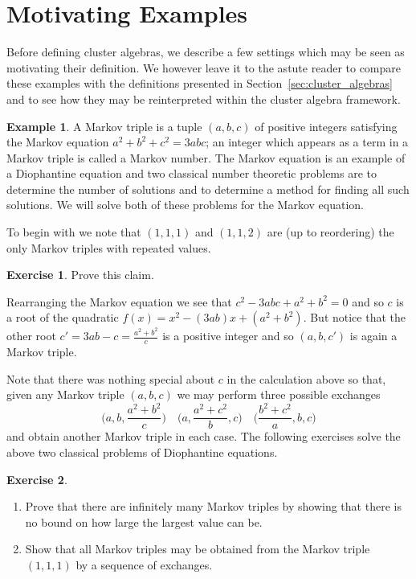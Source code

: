 \documentclass{amsart}
\theoremstyle{definition}
\newtheorem{example}[theorem]{Example}
\newtheorem{subexercise}{Exercise}[theorem]
\theoremstyle{remark}
\numberwithin{equation}{section}
\begin{document}
\section{Motivating Examples}\label{sec:motivation}
  Before defining cluster algebras, we describe a few settings which may be seen as motivating their definition.  We however leave it to the astute reader to compare these examples with the definitions presented in Section~\ref{sec:cluster_algebras} and to see how they may be reinterpreted within the cluster algebra framework.

  \begin{example}
    A Markov triple is a tuple $(a,b,c)$ of positive integers satisfying the Markov equation $a^2+b^2+c^2=3abc$; an integer which appears as a term in a Markov triple is called a Markov number.  The Markov equation is an example of a Diophantine equation and two classical number theoretic problems are to determine the number of solutions and to determine a method for finding all such solutions.  We will solve both of these problems for the Markov equation.

    To begin with we note that $(1,1,1)$ and $(1,1,2)$ are (up to reordering) the only Markov triples with repeated values.
    \begin{subexercise}
      Prove this claim.
    \end{subexercise}
    Rearranging the Markov equation we see that $c^2-3abc+a^2+b^2=0$ and so $c$ is a root of the quadratic $f(x)=x^2-(3ab)x+(a^2+b^2)$.  But notice that the other root $c'=3ab-c=\frac{a^2+b^2}{c}$ is a positive integer and so $(a,b,c')$ is again a Markov triple.  

    Note that there was nothing special about $c$ in the calculation above so that, given any Markov triple $(a,b,c)$ we may perform three possible exchanges 
    \[\Big(a,b,\frac{a^2+b^2}{c}\Big)\quad\Big(a,\frac{a^2+c^2}{b},c\Big)\quad\Big(\frac{b^2+c^2}{a},b,c\Big)\]
    and obtain another Markov triple in each case.  The following exercises solve the above two classical problems of Diophantine equations.
    \begin{subexercise}\mbox{}
      \begin{enumerate}
        \item Prove that there are infinitely many Markov triples by showing that there is no bound on how large the largest value can be.
        \item Show that all Markov triples may be obtained from the Markov triple $(1,1,1)$ by a sequence of exchanges.
      \end{enumerate}
    \end{subexercise}
  \end{example}
\end{document}
